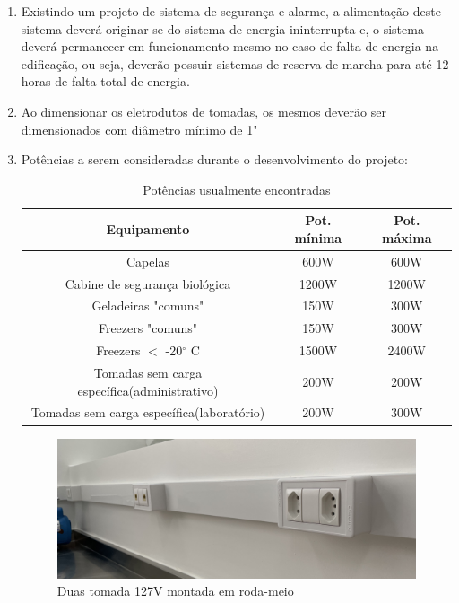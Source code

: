 \begin{enumerate}
	\item Existindo um projeto de sistema de segurança e alarme, a alimentação deste sistema deverá originar-se do sistema de energia ininterrupta e, o sistema deverá permanecer em funcionamento mesmo no caso de falta de energia na edificação, ou seja, deverão possuir sistemas de reserva de marcha para até 12 horas de falta total de energia.
	
	\item Ao dimensionar os eletrodutos de tomadas, os mesmos deverão ser dimensionados com diâmetro mínimo de 1"
	
	\item Potências a serem consideradas durante o desenvolvimento do projeto:
		\begin{table}[ht]
			\centering
			\caption{Potências usualmente encontradas}
			\begin{tabular}[t]{ccc}
				\toprule
				\color{Tue-red}\textbf{Equipamento}&\color{Tue-red}\textbf{Pot. mínima}&\color{Tue-red}\textbf{Pot. máxima}\\
				\midrule
				Capelas&600W&600W\\
				Cabine de segurança biológica&1200W&1200W\\
				Geladeiras "comuns"&150W&300W\\
				Freezers "comuns"&150W&300W\\
				Freezers $<$ -20$^{\circ}$ C&1500W&2400W\\
				Tomadas sem carga específica(administrativo)&200W&200W\\
				Tomadas sem carga específica(laboratório)&200W&300W\\
				\bottomrule
			\end{tabular}
			\label{table: potencias}
		\end{table}

	\begin{figure}[H]
		\includegraphics[width=\linewidth]{Figures/4. Socket/tomada1.jpg}
		\caption{Duas tomada 127V montada em roda-meio}
		\label{fig: tomada rodameio}
	\end{figure}
	\end{enumerate}
